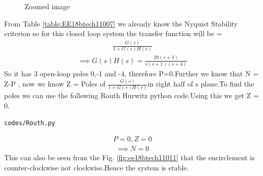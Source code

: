 \begin{enumerate}[label=\thesubsection.\arabic*.,ref=\thesubsection.\theenumi]
\begin{figure}[ht!]
  \caption{Zoomed image}
  \label{fig:zoomed}
\end{figure}
From Table \ref{table:EE18btech11007} we already know the Nyquist Stability criterion so for this closed loop system the transfer function will be =
\begin{align}
    \frac{G(s)}{1+G(s)H(s)}
\end{align}
\begin{align}
    \implies G(s)H(s)= \frac{20(s+3)}{s(s+1)(s+4)}
\end{align}
 So it has 3 open-loop poles 0,-1 and -4, therefore P=0.Further we know that N = Z-P , now we know Z = Poles of $\frac{G(s)}{1+G(s)H(s)}$in right half of s plane.To find the poles we can use the following Routh Hurwitz python code.Using this we get Z = 0.
 \begin{lstlisting}
codes/Routh.py
\end{lstlisting}
\begin{align}
    P = 0 , Z = 0
\end{align}
\begin{align}
    \implies N= 0
\end{align}
This can also be seen from the Fig. \ref{fig:ee18btech11011} that the encirclement is counter-clockwise not clockwise.Hence the system is stable.

\end{enumerate}

